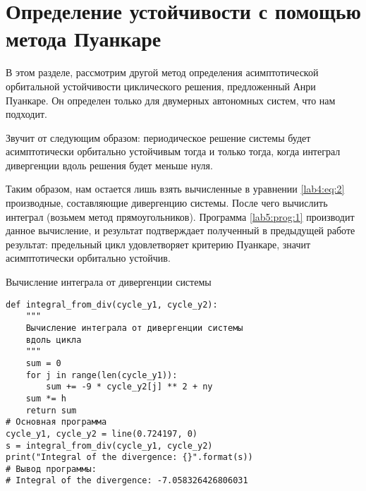 \chapter{Определение устойчивости с помощью метода Пуанкаре}\label{lab5}

В этом разделе, рассмотрим другой метод определения асимптотической орбитальной
устойчивости циклического решения, предложенный Анри Пуанкаре. Он определен
только для двумерных автономных систем, что нам подходит.

Звучит от следующим образом: периодическое решение системы будет асимптотически
орбитально устойчивым тогда и только тогда, когда интеграл дивергенции вдоль
решения будет меньше нуля.

Таким образом, нам остается лишь взять вычисленные в уравнении \ref{lab4:eq:2}
производные, составляющие дивергенцию системы. После чего вычислить интеграл
(возьмем метод прямоугольников). Программа \ref{lab5:prog:1} производит данное
вычисление, и результат подтверждает полученный в предыдущей работе результат:
предельный цикл удовлетворяет критерию Пуанкаре, значит асимптотически орбитально
устойчив.

\begin{program}
    \caption{Вычисление интеграла от дивергенции системы}
    \label{lab5:prog:1}
    \begin{verbatim}
def integral_from_div(cycle_y1, cycle_y2):
    """
    Вычисление интеграла от дивергенции системы
    вдоль цикла
    """
    sum = 0
    for j in range(len(cycle_y1)):
        sum += -9 * cycle_y2[j] ** 2 + ny
    sum *= h
    return sum
# Основная программа
cycle_y1, cycle_y2 = line(0.724197, 0)
s = integral_from_div(cycle_y1, cycle_y2)
print("Integral of the divergence: {}".format(s))
# Вывод программы:
# Integral of the divergence: -7.058326426806031
    \end{verbatim}
\end{program}